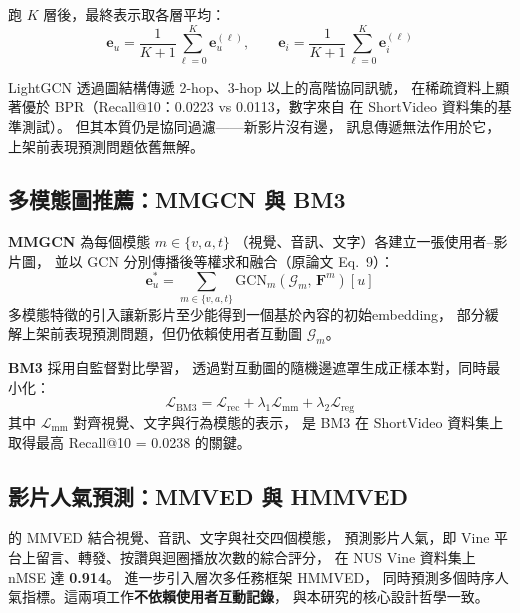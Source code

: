 \documentclass[12pt, a4paper]{article}
\begin{document}
跑 $K$ 層後，最終表示取各層平均：
\begin{equation}
  \mathbf{e}_u = \frac{1}{K+1}\sum_{\ell=0}^{K}\mathbf{e}_u^{(\ell)},
  \qquad
  \mathbf{e}_i = \frac{1}{K+1}\sum_{\ell=0}^{K}\mathbf{e}_i^{(\ell)}
  \label{eq:lightgcn_final}
\end{equation}

LightGCN 透過圖結構傳遞 2-hop、3-hop 以上的高階協同訊號，
在稀疏資料上顯著優於 BPR（Recall@10：0.0223 vs 0.0113，數字來自 \citealt{shang2025shortvideo} 在 ShortVideo 資料集的基準測試）。
但其本質仍是協同過濾——新影片沒有邊，
訊息傳遞無法作用於它，上架前表現預測問題依舊無解。

\subsection{多模態圖推薦：MMGCN 與 BM3}

\textbf{MMGCN} \citep{wei2019mmgcn} 為每個模態 $m\in\{v,a,t\}$
（視覺、音訊、文字）各建立一張使用者–影片圖，
並以 GCN 分別傳播後等權求和融合（原論文 Eq.~9）：
\begin{equation}
  \mathbf{e}_u^* = \sum_{m\in\{v,a,t\}}
    \mathrm{GCN}_m\!\left(\mathcal{G}_m,\,\mathbf{F}^m\right)[u]
  \label{eq:mmgcn}
\end{equation}
多模態特徵的引入讓新影片至少能得到一個基於內容的初始embedding，
部分緩解上架前表現預測問題，但仍依賴使用者互動圖 $\mathcal{G}_m$。

\textbf{BM3} \citep{zhou2023bootstrap} 採用自監督對比學習，
透過對互動圖的隨機邊遮罩生成正樣本對，同時最小化：
\begin{equation}
  \mathcal{L}_{\mathrm{BM3}} =
    \mathcal{L}_{\mathrm{rec}}
    + \lambda_1\mathcal{L}_{\mathrm{mm}}
    + \lambda_2\mathcal{L}_{\mathrm{reg}}
  \label{eq:bm3}
\end{equation}
其中 $\mathcal{L}_{\mathrm{mm}}$ 對齊視覺、文字與行為模態的表示，
是 BM3 在 ShortVideo 資料集上取得最高 Recall@10 = 0.0238 的關鍵。

\subsection{影片人氣預測：MMVED 與 HMMVED}

\citet{zhu2020mmved} 的 MMVED 結合視覺、音訊、文字與社交四個模態，
預測影片人氣，即 Vine 平台上留言、轉發、按讚與迴圈播放次數的綜合評分，
在 NUS Vine 資料集上 nMSE 達 \textbf{0.914}。
\citet{xie2021hmmved} 進一步引入層次多任務框架 HMMVED，
同時預測多個時序人氣指標。這兩項工作\textbf{不依賴使用者互動記錄}，
與本研究的核心設計哲學一致。
\end{document}
